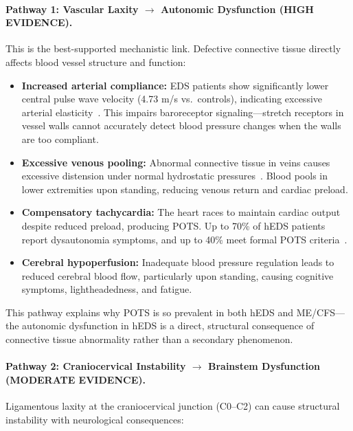 \paragraph{Pathway 1: Vascular Laxity $\rightarrow$ Autonomic Dysfunction (HIGH EVIDENCE).}

This is the best-supported mechanistic link. Defective connective tissue directly affects blood vessel structure and function:

\begin{itemize}
    \item \textbf{Increased arterial compliance:} EDS patients show significantly lower central pulse wave velocity (4.73 m/s vs.\ controls), indicating excessive arterial elasticity~\cite{Miller2020arterial}. This impairs baroreceptor signaling---stretch receptors in vessel walls cannot accurately detect blood pressure changes when the walls are too compliant.

    \item \textbf{Excessive venous pooling:} Abnormal connective tissue in veins causes excessive distension under normal hydrostatic pressures~\cite{Hakim2017cardiovascular}. Blood pools in lower extremities upon standing, reducing venous return and cardiac preload.

    \item \textbf{Compensatory tachycardia:} The heart races to maintain cardiac output despite reduced preload, producing POTS. Up to 70\% of hEDS patients report dysautonomia symptoms, and up to 40\% meet formal POTS criteria~\cite{Mathias2021dysautonomia}.

    \item \textbf{Cerebral hypoperfusion:} Inadequate blood pressure regulation leads to reduced cerebral blood flow, particularly upon standing, causing cognitive symptoms, lightheadedness, and fatigue.
\end{itemize}

This pathway explains why POTS is so prevalent in both hEDS and ME/CFS---the autonomic dysfunction in hEDS is a direct, structural consequence of connective tissue abnormality rather than a secondary phenomenon.

\paragraph{Pathway 2: Craniocervical Instability $\rightarrow$ Brainstem Dysfunction (MODERATE EVIDENCE).}

Ligamentous laxity at the craniocervical junction (C0--C2) can cause structural instability with neurological consequences:

